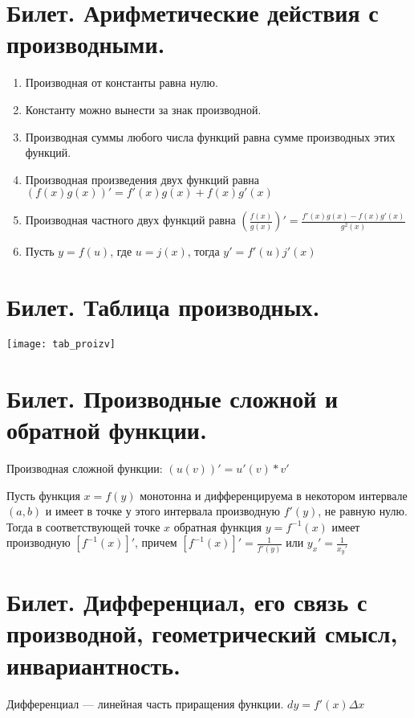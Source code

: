 \documentclass[12pt]{article}
\begin{document}
	\section{Билет. Арифметические действия с производными.}
	\begin{enumerate}
		\item Производная от константы равна нулю.
		\item Константу можно вынести за знак производной.
		\item Производная суммы любого числа функций равна сумме производных этих функций.
		\item Производная произведения двух функций равна \newline $(f(x)g(x))'=f'(x)g(x)+f(x)g'(x)$
		\item Производная частного двух функций равна $(\frac{f(x)}{g(x)})'=\frac{f'(x)g(x)-f(x)g'(x)}{g^2(x)} $
		\item Пусть $y=f(u)$, где $u=j(x)$, тогда $y'=f'(u)j'(x)$
		
		
	\end{enumerate}
	
	\section{Билет. Таблица производных.}

	\texttt{[image: tab\_proizv]}
	

	\section{Билет. Производные сложной и обратной функции.}

	
	Производная сложной функции: $(u(v))'=u'(v)*v'$
	
	
	Пусть функция $x=f(y)$ монотонна и дифференцируема в некотором интервале $(a,b)$ и имеет в точке у этого интервала производную $f'(y)$, не равную нулю. Тогда в соответствующей точке $x$ обратная функция $y=f^{-1}(x)$ имеет производную $[f^{-1}(x)]'$, причем $[f^{-1}(x)]'=\frac{1}{f'(y)}$ или $y_x'=\frac{1}{x_y'}$
	
	
	\section{Билет. Дифференциал, его связь с производной, геометрический смысл, инвариантность.}
	
	Дифференциал  — линейная часть приращения функции. $dy=f'(x)\Delta x$
	
\end{document}
